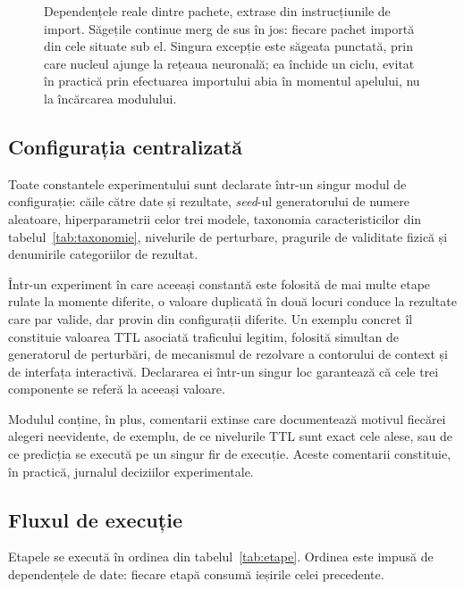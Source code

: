 \begin{figure}[!h]
    \caption{Dependențele reale dintre pachete, extrase din instrucțiunile de import. Săgețile continue merg de sus în jos: fiecare pachet importă din cele situate sub el. Singura excepție este săgeata punctată, prin care nucleul ajunge la rețeaua neuronală; ea închide un ciclu, evitat în practică prin efectuarea importului abia în momentul apelului, nu la încărcarea modulului.}
    \label{fig:pachete}
\end{figure}

\subsection{Configurația centralizată}\label{subsec:configuratie}

Toate constantele experimentului sunt declarate într-un singur modul de configu\-rație: căile către date și rezultate, \textit{seed}-ul generatorului de numere aleatoare, hiperparametrii celor trei modele, taxonomia caracteristicilor din tabelul~\ref{tab:taxonomie}, nivelurile de perturbare, pragurile de validitate fizică și denumirile categoriilor de rezultat.

Într-un experiment în care aceeași constantă este folosită de mai multe etape rulate la momente diferite, o valoare duplicată în două locuri conduce la rezultate care par valide, dar provin din configurații diferite. Un exemplu concret îl constituie valoarea TTL asociată traficului legitim, folosită simultan de generatorul de perturbări, de mecanismul de rezolvare a contorului de context și de interfața interactivă. Declararea ei într-un singur loc garantează că cele trei componente se referă la aceeași valoare.

Modulul conține, în plus, comentarii extinse care documentează motivul fiecărei alegeri neevidente, de exemplu, de ce nivelurile TTL sunt exact cele alese, sau de ce predicția se execută pe un singur fir de execuție. Aceste comentarii constituie, în practică, jurnalul deciziilor experimentale.

\subsection{Fluxul de execuție}\label{subsec:flux}

Etapele se execută în ordinea din tabelul~\ref{tab:etape}. Ordinea este impusă de dependențele de date: fiecare etapă consumă ieșirile celei precedente.

